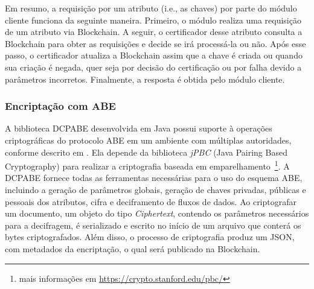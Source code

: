 \documentclass[a4paper,11pt]{article}
\begin{document}


{\color{blue}Em resumo, a requisição por um atributo (i.e., as chaves) por parte do módulo cliente funciona da seguinte maneira. Primeiro, o módulo realiza uma requisição de um atributo via Blockchain. A seguir, o certificador desse atributo consulta a Blockchain para obter as requisições e decide se irá processá-la ou não. Após esse passo, o certificador atualiza a Blockchain assim que a chave é criada ou quando sua criação é negada, quer seja por decisão do certificação ou por falha devido a parâmetros incorretos. Finalmente, a resposta é obtida pelo módulo cliente.}

\subsubsection{Encriptação com ABE}


A biblioteca DCPABE desenvolvida em Java possui suporte à operações criptográficas do protocolo ABE em um ambiente com múltiplas autoridades, conforme descrito em \cite{Lewko2011}. Ela depende da biblioteca \emph{jPBC} (Java Pairing Based Cryptography) %
para realizar a criptografia baseada em emparelhamento~\footnote{mais informações em \href{https://crypto.stanford.edu/pbc/}{https://crypto.stanford.edu/pbc/}}. %
A DCPABE fornece todas as ferramentas necessárias para o uso do esquema ABE, incluindo a geração de parâmetros globais, geração de chaves privadas, públicas e pessoais dos atributos, cifra e deciframento de fluxos de dados.
Ao criptografar um documento, um objeto do tipo \emph{Ciphertext}, contendo os parâmetros necessários para a decifragem, é serializado e escrito no início de um arquivo que conterá os bytes criptografados. {\color{blue}Além disso, o processo de criptografia produz um JSON, com metadados da encriptação, o qual será publicado na Blockchain}.
\end{document}
